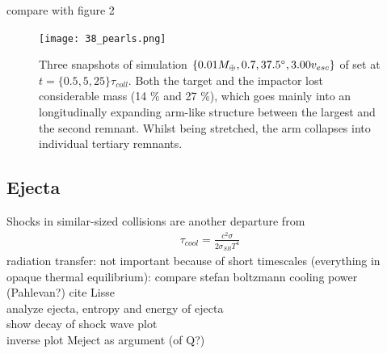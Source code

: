 \cite{Agnor:2004p3329} compare with figure 2\\

\begin{figure}[h!]
\begin{center}
\texttt{[image: 38\_pearls.png]}
\caption{Three snapshots of simulation $\{ 0.01 M_{\oplus}, 0.7, 37.5 ^\circ, 3.00 v_{esc}\}$ of set \css at $t = \{0.5, 5, 25\} \tau_{coll}$. Both the target and the impactor lost considerable mass (14 \% and 27 \%), which goes mainly into an longitudinally expanding arm-like structure between the largest and the second remnant. Whilst being stretched, the arm collapses into individual tertiary remnants.}
\label{ch03_fig38}
\end{center}
\end{figure}



\subsection{Ejecta}
Shocks in similar-sized collisions are another departure from 
\begin{align}
\tau_{cool} = \frac{c^2 \sigma}{ 2 \sigma_{SB} T^4}
\end{align}
\cite{Thompson:1988p3451}
radiation transfer: not important because of short timescales (everything in opaque thermal equilibrium): compare stefan boltzmann cooling power (Pahlevan?)
cite Lisse\\
analyze ejecta, entropy and energy of ejecta \\
show decay of shock wave plot\\ %
inverse plot Meject as argument (of Q?)\\

